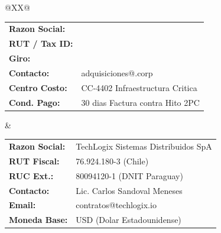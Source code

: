 \documentclass[11pt,a4paper]{article}
\begin{document}
\noindent
\begin{tabularx}{\linewidth}{@{}XX@{}}
  \begin{tcolorbox}[
    enhanced,
    colback=white,
    colframe=corpBorder,
    title={\small\bfseries\color{corpPrimary}DATOS DEL EMISOR / COMPRADOR},
    colbacktitle=corpLightBg,
    arc=1.5mm,
    boxrule=0.6pt,
    top=2.5mm, bottom=2.5mm, left=3.5mm, right=3.5mm
  ]
    {\footnotesize\renewcommand{\arraystretch}{1.2}
    \begin{tabular}{@{}ll@{}}
      \textbf{Razon Social:} & \corporatebrandlegal \\
      \textbf{RUT / Tax ID:} & \corporatebrandrut \\
      \textbf{Giro:} & \corporatebrandtagline \\
      \textbf{Contacto:} & adquisiciones@\corporatebrand.corp \\
      \textbf{Centro Costo:} & CC-4402 Infraestructura Critica \\
      \textbf{Cond. Pago:} & 30 dias Factura contra Hito 2PC
    \end{tabular}}
  \end{tcolorbox}
  &
  \begin{tcolorbox}[
    enhanced,
    colback=white,
    colframe=corpBorder,
    title={\small\bfseries\color{corpPrimary}DATOS DEL PROVEEDOR / BENEFICIARIO},
    colbacktitle=corpLightBg,
    arc=1.5mm,
    boxrule=0.6pt,
    top=2.5mm, bottom=2.5mm, left=3.5mm, right=3.5mm
  ]
    {\footnotesize\renewcommand{\arraystretch}{1.2}
    \begin{tabular}{@{}ll@{}}
      \textbf{Razon Social:} & TechLogix Sistemas Distribuidos SpA \\
      \textbf{RUT Fiscal:} & 76.924.180-3 (Chile) \\
      \textbf{RUC Ext.:} & 80094120-1 (DNIT Paraguay) \\
      \textbf{Contacto:} & Lic. Carlos Sandoval Meneses \\
      \textbf{Email:} & contratos@techlogix.io \\
      \textbf{Moneda Base:} & USD (Dolar Estadounidense)
    \end{tabular}}
  \end{tcolorbox}
\end{tabularx}

\vspace{2mm}
\end{document}
